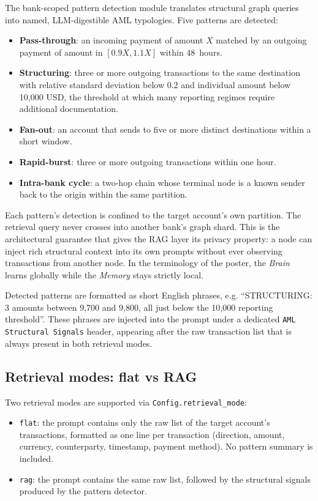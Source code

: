 \documentclass{report}
\begin{document}
The bank-scoped pattern detection module translates structural graph queries into named, LLM-digestible AML typologies. Five patterns are detected:

\begin{itemize}
    \setlength\itemsep{0em}
    \item \textbf{Pass-through}: an incoming payment of amount $X$ matched by an outgoing payment of amount in $[0.9X, 1.1X]$ within 48~hours.
    \item \textbf{Structuring}: three or more outgoing transactions to the same destination with relative standard deviation below 0.2 and individual amount below 10{,}000 USD, the threshold at which many reporting regimes require additional documentation.
    \item \textbf{Fan-out}: an account that sends to five or more distinct destinations within a short window.
    \item \textbf{Rapid-burst}: three or more outgoing transactions within one hour.
    \item \textbf{Intra-bank cycle}: a two-hop chain whose terminal node is a known sender back to the origin within the same partition.
\end{itemize}

Each pattern's detection is confined to the target account's own partition. The retrieval query never crosses into another bank's graph shard. This is the architectural guarantee that gives the RAG layer its privacy property: a node can inject rich structural context into its own prompts without ever observing transactions from another node. In the terminology of the poster, the \textit{Brain} learns globally while the \textit{Memory} stays strictly local.

Detected patterns are formatted as short English phrases, e.g. \enquote{STRUCTURING: 3 amounts between 9{,}700 and 9{,}800, all just below the 10{,}000 reporting threshold}. These phrases are injected into the prompt under a dedicated \texttt{AML Structural Signals} header, appearing after the raw transaction list that is always present in both retrieval modes.

\subsection{Retrieval modes: flat vs RAG}

Two retrieval modes are supported via \texttt{Config.retrieval\_mode}:

\begin{itemize}
    \setlength\itemsep{0em}
    \item \texttt{flat}: the prompt contains only the raw list of the target account's transactions, formatted as one line per transaction (direction, amount, currency, counterparty, timestamp, payment method). No pattern summary is included.
    \item \texttt{rag}: the prompt contains the same raw list, followed by the structural signals produced by the pattern detector.
\end{itemize}
\end{document}

